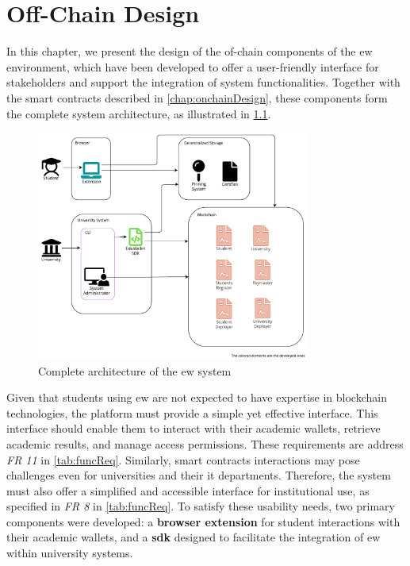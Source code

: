 \chapter{Off-Chain Design}
\label{chap:offchainDesign}
In this chapter, we present the design of the of-chain components of the \acrlong{ew} environment, which have been developed to offer a user-friendly interface for stakeholders and support the integration of system functionalities. Together with the smart contracts described in \cref{chap:onchainDesign}, these components form the complete system architecture, as illustrated in \cref{fig:fullArchDiag}. 

\begin{figure}[htpb]
  \centering
  \includegraphics[width=0.8\textwidth]{figures/Architecture diagram complete.pdf}
  \caption[System architecture diagram]{Complete architecture of the \acrlong{ew} system}
  \label{fig:fullArchDiag}
\end{figure}

Given that students using \acrshort{ew} are not expected to have expertise in blockchain technologies, the platform must provide a simple yet effective interface. This interface should enable them to interact with their academic wallets, retrieve academic results, and manage access permissions. These requirements are address \textit{FR 11} in \cref{tab:funcReq}. Similarly, smart contracts interactions may pose challenges even for universities and their \acrfull{it} departments. Therefore, the system must also offer a simplified and accessible interface for institutional use, as specified in \textit{FR 8} in \cref{tab:funcReq}. 
To satisfy these usability needs, two primary components were developed: a \textbf{browser extension} for student interactions with their academic wallets, and a \textbf{\acrlong{sdk}} designed to facilitate the integration of \acrshort{ew} within university systems.

